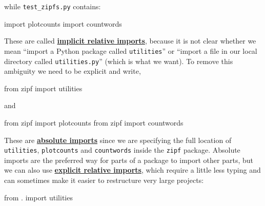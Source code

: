 \documentclass[
]{krantz}
\makeatletter
\newenvironment{Shaded}{\begin{snugshade}}{\end{snugshade}}
\newcommand{\ImportTok}[1]{#1}
\newcommand{\NormalTok}[1]{#1}
\newenvironment{kframe}{%
\medskip{}
\setlength{\fboxsep}{.8em}
 \def\at@end@of@kframe{}%
 \ifinner\ifhmode%
  \def\at@end@of@kframe{\end{minipage}}%
  \begin{minipage}{\columnwidth}%
 \fi\fi%
 \def\FrameCommand##1{\hskip\@totalleftmargin \hskip-\fboxsep
 \colorbox{shadecolor}{##1}\hskip-\fboxsep
     \hskip-\linewidth \hskip-\@totalleftmargin \hskip\columnwidth}%
 \MakeFramed {\advance\hsize-\width
   \@totalleftmargin\z@ \linewidth\hsize
   \@setminipage}}%
 {\par\unskip\endMakeFramed%
 \at@end@of@kframe}
\renewenvironment{Shaded}{\begin{kframe}}{\end{kframe}}
\newcommand{\gref}[2]{\hyperlink{#2}{\textbf{#1}}}
\makeatother
\begin{document}
while \texttt{test\_zipfs.py} contains:

\begin{Shaded}
\begin{Highlighting}[]
\ImportTok{import}\NormalTok{ plotcounts}
\ImportTok{import}\NormalTok{ countwords}
\end{Highlighting}
\end{Shaded}

These are called
\gref{implicit relative imports}{implicit\_relative\_import},
because it is not clear whether we mean
``import a Python package called \texttt{utilities}''
or
``import a file in our local directory called \texttt{utilities.py}''
(which is what we want).
To remove this ambiguity we need to be explicit and write,

\begin{Shaded}
\begin{Highlighting}[]
\ImportTok{from}\NormalTok{ zipf }\ImportTok{import}\NormalTok{ utilities}
\end{Highlighting}
\end{Shaded}

and

\begin{Shaded}
\begin{Highlighting}[]
\ImportTok{from}\NormalTok{ zipf }\ImportTok{import}\NormalTok{ plotcounts}
\ImportTok{from}\NormalTok{ zipf }\ImportTok{import}\NormalTok{ countwords}
\end{Highlighting}
\end{Shaded}

These are \gref{absolute imports}{absolute\_import}
since we are specifying the full location of \texttt{utilities}, \texttt{plotcounts} and \texttt{countwords}
inside the \texttt{zipf} package.
Absolute imports are the preferred way for parts of a package to import other parts,
but we can also use
\gref{explicit relative imports}{explicit\_relative\_import},
which require a little less typing
and can sometimes make it easier to restructure very large projects:

\begin{Shaded}
\begin{Highlighting}[]
\ImportTok{from}\NormalTok{ . }\ImportTok{import}\NormalTok{ utilities}
\end{Highlighting}
\end{Shaded}
\end{document}
